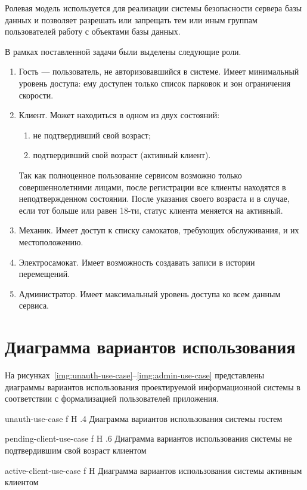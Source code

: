 Ролевая модель используется для реализации системы безопасности сервера базы данных и позволяет разрешать или запрещать тем или иным группам пользователей работу с объектами базы данных.

В рамках поставленной задачи были выделены следующие роли.

\begin{enumerate}
	\item Гость --- пользователь, не авторизовавшийся в системе. Имеет минимальный уровень доступа: ему доступен только список парковок и зон ограничения скорости.
	\item Клиент. Может находиться в одном из двух состояний:
	      \begin{enumerate}
		      \item не подтвердивший свой возраст;
		      \item подтвердивший свой возраст (активный клиент).
	      \end{enumerate}
	      Так как полноценное пользование сервисом возможно только совершеннолетними лицами, после регистрации все клиенты находятся в неподтвержденном состоянии. После указания своего возраста и в случае, если тот больше или равен 18-ти, статус клиента меняется на активный.
	\item Механик. Имеет доступ к списку самокатов, требующих обслуживания, и их местоположению.
	\item Электросамокат. Имеет возможность создавать записи в истории перемещений.
	\item Администратор. Имеет максимальный уровень доступа ко всем данным сервиса.
\end{enumerate}

\pagebreak
\section{Диаграмма вариантов использования}

На рисунках~\ref{img:unauth-use-case}--\ref{img:admin-use-case} представлены диаграммы вариантов использования проектируемой информационной системы в соответствии с формализацией пользователей приложения.

{unauth-use-case}
{f}
{H}
{.4\textwidth}
{Диаграмма вариантов использования системы гостем}

{pending-client-use-case}
{f}
{H}
{.6\textwidth}
{Диаграмма вариантов использования системы не подтвердившим свой возраст клиентом}

{active-client-use-case}
{f}
{H}
{\textwidth}
{Диаграмма вариантов использования системы активным клиентом}

